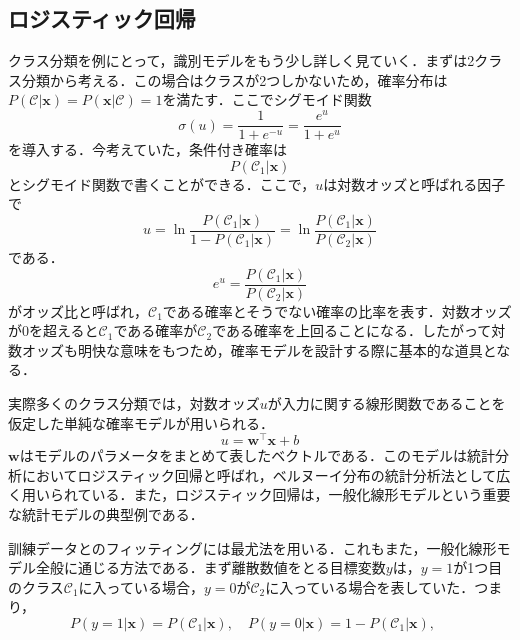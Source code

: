 \documentclass[a4paper,11pt]{jsreport}
\begin{document}
\subsection{ロジスティック回帰}
クラス分類を例にとって，識別モデルをもう少し詳しく見ていく．まずは2クラス分類から考える．この場合はクラスが2つしかないため，確率分布は$P(\mathcal{C} | \bm{x}) = P(\bm{x} | \mathcal{C}) = 1$を満たす．ここでシグモイド関数
\begin{equation}
  \sigma(u) 
  = \frac{1}{1 + e^{-u}}
  = \frac{e^u}{1 + e^u}
\end{equation}
を導入する．今考えていた，条件付き確率は
\begin{equation}
  P(\mathcal{C}_1 | \bm{x})
\end{equation}
とシグモイド関数で書くことができる．ここで，$u$は対数オッズと呼ばれる因子で
\begin{equation}
  u 
  = \ln{\frac{P(\mathcal{C}_1 | \bm{x})}{1 - P(\mathcal{C}_1 | \bm{x})}}
  = \ln{\frac{P(\mathcal{C}_1 | \bm{x})}{P(\mathcal{C}_2 | \bm{x})}}
\end{equation}
である．
\begin{equation}
  e^u
  = \frac{P(\mathcal{C}_1 | \bm{x})}{P(\mathcal{C}_2 | \bm{x})}
\end{equation}
がオッズ比と呼ばれ，$\mathcal{C}_1$である確率とそうでない確率の比率を表す．対数オッズが0を超えると$\mathcal{C}_1$である確率が$\mathcal{C}_2$である確率を上回ることになる．したがって対数オッズも明快な意味をもつため，確率モデルを設計する際に基本的な道具となる．\par
実際多くのクラス分類では，対数オッズ$u$が入力に関する線形関数であることを仮定した単純な確率モデルが用いられる．
\begin{equation}
  u = \bm{w}^{\top} \bm{x} + b
\end{equation}
$\bm{w}$はモデルのパラメータをまとめて表したベクトルである．このモデルは統計分析においてロジスティック回帰と呼ばれ，ベルヌーイ分布の統計分析法として広く用いられている．また，ロジスティック回帰は，一般化線形モデルという重要な統計モデルの典型例である．\par
訓練データとのフィッティングには最尤法を用いる．これもまた，一般化線形モデル全般に通じる方法である．まず離散数値をとる目標変数$y$は，$y=1$が1つ目のクラス$\mathcal{C}_1$に入っている場合，$y=0$が$\mathcal{C}_2$に入っている場合を表していた．つまり，
\begin{equation}
  P(y=1 | \bm{x})
  = P(\mathcal{C}_1 | \bm{x}), \quad
  P(y=0 | \bm{x})
  = 1 - P(\mathcal{C}_1 | \bm{x}), \quad
\end{equation}
\end{document}
